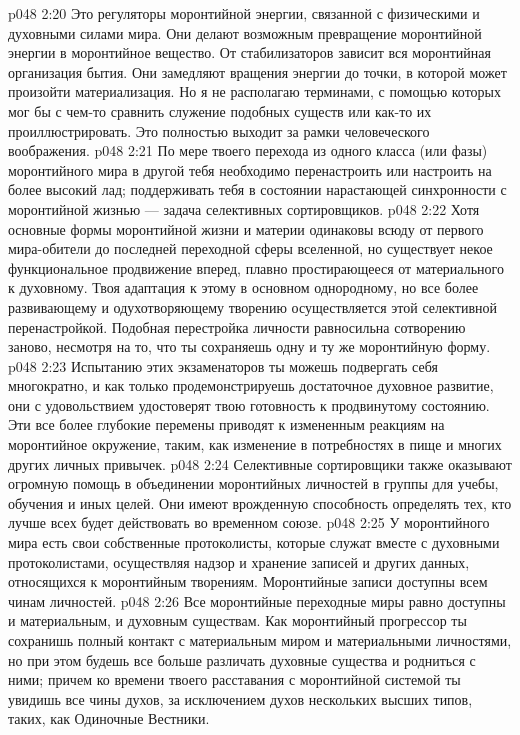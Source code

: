 \vs p048 2:20 \bibnobreakspace {} Это регуляторы моронтийной энергии, связанной с физическими и духовными силами мира. Они делают возможным превращение моронтийной энергии в моронтийное вещество. От стабилизаторов зависит вся моронтийная организация бытия. Они замедляют вращения энергии до точки, в которой может произойти материализация. Но я не располагаю терминами, с помощью которых мог бы с чем\hyp{}то сравнить служение подобных существ или как\hyp{}то их проиллюстрировать. Это полностью выходит за рамки человеческого воображения.
\vs p048 2:21 \bibnobreakspace {} По мере твоего перехода из одного класса (или фазы) моронтийного мира в другой тебя необходимо перенастроить или настроить на более высокий лад; поддерживать тебя в состоянии нарастающей синхронности с моронтийной жизнью --- задача селективных сортировщиков.
\vs p048 2:22 Хотя основные формы моронтийной жизни и материи одинаковы всюду от первого мира\hyp{}обители до последней переходной сферы вселенной, но существует некое функциональное продвижение вперед, плавно простирающееся от материального к духовному. Твоя адаптация к этому в основном однородному, но все более развивающему и одухотворяющему творению осуществляется этой селективной перенастройкой. Подобная перестройка личности равносильна сотворению заново, несмотря на то, что ты сохраняешь одну и ту же моронтийную форму.
\vs p048 2:23 Испытанию этих экзаменаторов ты можешь подвергать себя многократно, и как только продемонстрируешь достаточное духовное развитие, они с удовольствием удостоверят твою готовность к продвинутому состоянию. Эти все более глубокие перемены приводят к измененным реакциям на моронтийное окружение, таким, как изменение в потребностях в пище и многих других личных привычек.
\vs p048 2:24 Селективные сортировщики также оказывают огромную помощь в объединении моронтийных личностей в группы для учебы, обучения и иных целей. Они имеют врожденную способность определять тех, кто лучше всех будет действовать во временном союзе.
\vs p048 2:25 \bibnobreakspace {} У моронтийного мира есть свои собственные протоколисты, которые служат вместе с духовными протоколистами, осуществляя надзор и хранение записей и других данных, относящихся к моронтийным творениям. Моронтийные записи доступны всем чинам личностей.
\vs p048 2:26 Все моронтийные переходные миры равно доступны и материальным, и духовным существам. Как моронтийный прогрессор ты сохранишь полный контакт с материальным миром и материальными личностями, но при этом будешь все больше различать духовные существа и родниться с ними; причем ко времени твоего расставания с моронтийной системой ты увидишь все чины духов, за исключением духов нескольких высших типов, таких, как Одиночные Вестники.

